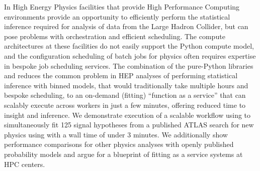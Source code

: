 In High Energy Physics facilities that provide High Performance Computing environments provide an opportunity to efficiently perform the statistical inference required for analysis of data from the Large Hadron Collider, but can pose problems with orchestration and efficient scheduling.
The compute architectures at these facilities do not easily support the Python compute model, and the configuration scheduling of batch jobs for physics often requires expertise in bespoke job scheduling services.
The combination of the pure-Python libraries \pyhf{} and \funcX{} reduces the common problem in HEP analyses of performing statistical inference with binned models, that would traditionally take multiple hours and bespoke scheduling, to an on-demand (fitting) ``function as a service'' that can scalably execute across workers in just a few minutes, offering reduced time to insight and inference.
We demonstrate execution of a scalable workflow using \funcX{} to simultaneously fit 125 signal hypotheses from a published ATLAS search for new physics using \pyhf{} with a wall time of under 3 minutes.
We additionally show performance comparisons for other physics analyses with openly published probability models and argue for a blueprint of fitting as a service systems at HPC centers.
